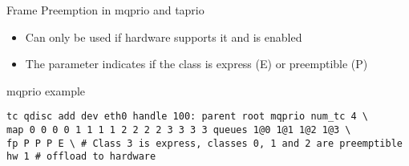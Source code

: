 \begin{frame}[fragile]{Frame Preemption in mqprio and taprio}
	\begin{itemize}
		\item Can only be used if hardware supports it and  is enabled
		\item The  parameter indicates if the class is express (E) or preemptible (P)
	\end{itemize}
	\begin{block}{mqprio example}
		\begin{verbatim}
tc qdisc add dev eth0 handle 100: parent root mqprio num_tc 4 \
map 0 0 0 0 1 1 1 1 2 2 2 2 3 3 3 3 queues 1@0 1@1 1@2 1@3 \
fp P P P E \ # Class 3 is express, classes 0, 1 and 2 are preemptible
hw 1 # offload to hardware
		\end{verbatim}
	\end{block}
\end{frame}

